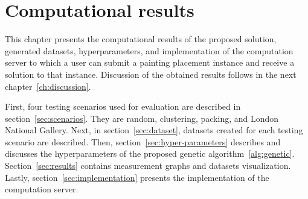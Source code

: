 \chapter{Computational results}\label{ch:computational-results}

This chapter presents the computational results of the proposed solution,
generated datasets, hyperparameters,
and implementation of the computation server
to which a user can submit a painting placement instance
and receive a solution to that instance.
Discussion of the obtained results follows in the next chapter~\ref{ch:discussion}.

First, four testing scenarios used for evaluation are described in
section~\ref{sec:scenarios}.
They are random, clustering, packing, and London National Gallery.
Next, in section~\ref{sec:dataset}, datasets created for each testing scenario are described.
Then, section~\ref{sec:hyper-parameters} describes and discusses
the hyperparameters of the proposed genetic algorithm~\ref{alg:genetic}.
Section~\ref{sec:results} contains measurement graphs and datasets visualization.
Lastly, section~\ref{sec:implementation} presents the implementation of the computation server.






